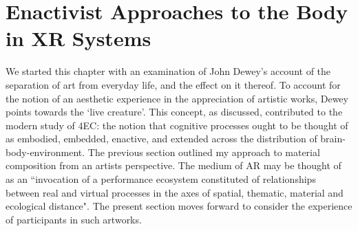 \section{Enactivist Approaches to the Body in XR Systems}\label{sec: theory-embodiment}
We started this chapter with an examination of John Dewey's account of the separation of art from everyday life, and the effect on it thereof. To account for the notion of an aesthetic experience in the appreciation of artistic works, Dewey points towards the `live creature'. This concept, as discussed, contributed to the modern study of 4EC: the notion that cognitive processes ought to be thought of as embodied, embedded, enactive, and extended across the distribution of brain-body-environment. The previous section outlined my approach to material composition from an artists perspective. The medium of AR may be thought of as an ``invocation of a performance ecosystem constituted of relationships between real and virtual processes in the axes of spatial, thematic, material and ecological distance". The present section moves forward to consider the experience of participants in such artworks.

